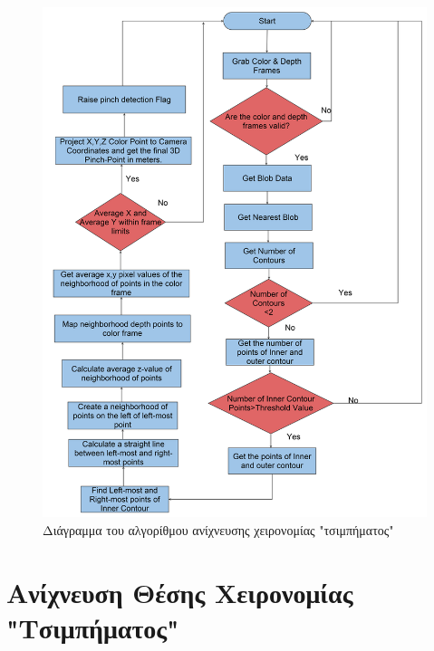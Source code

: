 \begin{figure}[H]
    \centering
    \includegraphics[scale=0.5, angle=0]{Files/Figures/pinch_gesture_detection.png}
    \caption[Διάγραμμα του αλγορίθμου ανίχνευσης χειρονομίας "τσιμπήματος"]{Διάγραμμα του αλγορίθμου ανίχνευσης χειρονομίας "τσιμπήματος"}
    \label{fig:gesture_rec}
\end{figure}






\section{Ανίχνευση Θέσης Χειρονομίας "Τσιμπήματος"}


